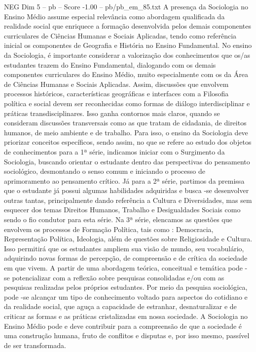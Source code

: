 \begin{textsample}{NEG Dim 5 – pb – Score -1.00 – pb/pb\_em\_85.txt}
A presença da Sociologia no Ensino Médio assume especial relevância como abordagem qualificada da realidade social que enriquece a formação desenvolvida pelos demais componentes curriculares de Ciências Humanas e Sociais Aplicadas, tendo como referência inicial os componentes de Geografia e História no Ensino Fundamental.
No ensino da Sociologia, é importante considerar a valorização dos conhecimentos que os/as estudantes trazem do Ensino Fundamental, dialogando com os demais componentes curriculares do Ensino Médio, muito especialmente com os da Área de Ciências Humanas e Sociais Aplicadas.
Assim, discussões que envolvem processos históricos, características geográficas e interfaces com a Filosofia política e social devem ser reconhecidas como formas de diálogo interdisciplinar e práticas transdisciplinares.
Isso ganha contornos mais claros, quando se consideram discussões transversais como as que tratam de cidadania, de direitos humanos, de meio ambiente e de trabalho.
Para isso, o ensino da Sociologia deve priorizar conceitos específicos, sendo assim, no que se refere ao estudo dos objetos de conhecimentos para a 1ª série, indicamos iniciar com o Surgimento da Sociologia, buscando orientar o estudante dentro das perspectivas do pensamento sociológico, desmontando o senso comum e iniciando o processo de aprimoramento ao pensamento crítico.
Já para a 2ª série, partimos da premissa que o estudante já possui algumas habilidades adquiridas e busca -se desenvolver outras tantas, principalmente dando referência a Cultura e Diversidades, mas sem esquecer dos temas Direitos Humanos, Trabalho e Desigualdades Sociais como sendo o fio condutor para esta série.
Na 3ª série, elencamos as questões que envolvem os processos de Formação Política, tais como : Democracia, Representação Política, Ideologia, além de questões sobre Religiosidade e Cultura.
Isso permitirá que os estudantes ampliem sua visão de mundo, seu vocabulário, adquirindo novas formas de percepção, de compreensão e de crítica da sociedade em que vivem.
A partir de uma abordagem teórica, conceitual e temática pode -se potencializar com a reflexão sobre pesquisas consolidadas e/ou com as pesquisas realizadas pelos próprios estudantes.
Por meio da pesquisa sociológica, pode -se alcançar um tipo de conhecimento voltado para aspectos do cotidiano e da realidade social, que aguça a capacidade de estranhar, desnaturalizar e de criticar as formas e as práticas cristalizadas em nossa sociedade.
A Sociologia no Ensino Médio pode e deve contribuir para a compreensão de que a sociedade é uma construção humana, fruto de conflitos e disputas e, por isso mesmo, passível de ser transformada.

\end{textsample}
